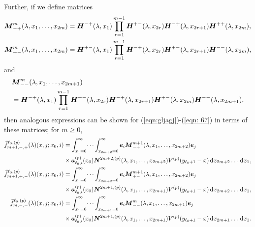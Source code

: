 Further, if we define matrices
\begin{align*}
	\boldsymbol M^{m}_{-+}(\lambda,x_1,\dots,x_{2m}) &= \boldsymbol H^{-+}(\lambda,x_1)\prod_{r=1}^{m-1}\boldsymbol H^{+-}(\lambda,x_{2r}) \boldsymbol H^{-+}(\lambda,x_{2r+1}) \boldsymbol H^{++}(\lambda,x_{2m}),
	\\\boldsymbol M^{m}_{+-}(\lambda,x_1,\dots,x_{2m}) &= \boldsymbol H^{+-}(\lambda,x_1)\prod_{r=1}^{m-1}\boldsymbol H^{-+}(\lambda,x_{2r}) \boldsymbol H^{+-}(\lambda,x_{2r+1}) \boldsymbol H^{--}(\lambda,x_{2m}),
\end{align*}
and
\begin{align*}
	&\boldsymbol M^{m}_{--}(\lambda,x_1,\dots,x_{2m+1}) \nonumber 
	\\&= \boldsymbol H^{-+}(\lambda,x_1)\prod_{r=1}^{m-1}\boldsymbol H^{+-}(\lambda,x_{2r}) \boldsymbol H^{-+}(\lambda,x_{2r+1}) \boldsymbol H^{+-}(\lambda,x_{2m}) 
	\boldsymbol H^{--}(\lambda,x_{2m+1}),\nonumber 
\end{align*}
then analogous expressions can be shown for (\ref{eqn:gljagj})-(\ref{eqn: 67}) in terms of these matrices; for \(m\geq 0\), 
\begin{align*}
	\widehat f^{\ell_0,(p)}_{m+1,-,+}(\lambda)(x, j; x_0,i) &= 
		\int_{x_1=0}^\infty \dots \int_{x_{2m+2}=0}^\infty \boldsymbol e_i\boldsymbol M^{m+1}_{-+}(\lambda,x_1,\dots,x_{2m+2})\boldsymbol e_j \nonumber 
		\\&\times \boldsymbol a_{\ell_0,i}^{(p)}(x_0) \boldsymbol N^{2m+2,(p)}(\lambda,x_1,\dots,x_{2m+2}) V^{(p)}(y_{\ell_0+1}-x)\, \mathrm{d} x_{2m+2}\dots\, \mathrm{d} x_1,
	\\ \widehat f^{\ell_0,(p)}_{m+1,+,-}(\lambda)(x, j; x_0,i) &= 
		\int_{x_1=0}^\infty \dots \int_{x_{2m+2}=0}^\infty \boldsymbol e_i\boldsymbol M^{m+1}_{+-}(\lambda,x_1,\dots,x_{2m+2})\boldsymbol e_j \nonumber 
		\\&\times \boldsymbol a_{\ell_0,i}^{(p)}(x_0) \boldsymbol N^{2m+1,(p)}(\lambda,x_1,\dots,x_{2m+1}) V^{(p)}(y_{\ell_0+1}-x)\, \mathrm{d} x_{2m+2}\dots\, \mathrm{d} x_1,
	\\ \widehat f^{\ell_0,(p)}_{m,-,-}(\lambda)(x, j; x_0,i) &= 
		\int_{x_1=0}^\infty \dots \int_{x_{2m+1}=0}^\infty \boldsymbol e_i\boldsymbol M^m_{--}(\lambda,x_1,\dots,x_{2m+1})\boldsymbol e_j \nonumber 
		\\&\times \boldsymbol a_{\ell_0,i}^{(p)}(x_0) \boldsymbol N^{2m+1,(p)}(\lambda,x_1,\dots,x_{2m+1}) V^{(p)}(y_{\ell_0+1}-x)\, \mathrm{d} x_{2m+1}\dots\, \mathrm{d} x_1.
\end{align*}

